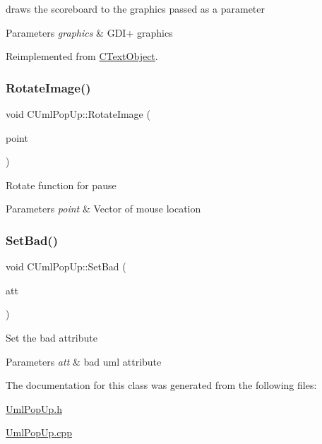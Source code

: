 draws the scoreboard to the graphics passed as a parameter 
\begin{DoxyParams}{Parameters}
{\em graphics} & G\+D\+I+ graphics \\
\hline
\end{DoxyParams}


Reimplemented from \mbox{\hyperlink{class_c_text_object_a467038e52d2e587083526cc42a76131f}{C\+Text\+Object}}.

\mbox{\label{class_c_uml_pop_up_a71d5c02b32a372120c438a2e607b1bae}} 
\subsubsection{\texorpdfstring{RotateImage()}{RotateImage()}}
{\footnotesize\ttfamily void C\+Uml\+Pop\+Up\+::\+Rotate\+Image (\begin{DoxyParamCaption}\item[{C\+Point}]{point }\end{DoxyParamCaption})\hspace{0.3cm}{\ttfamily [inline]}}

Rotate function for pause 
\begin{DoxyParams}{Parameters}
{\em point} & Vector of mouse location \\
\hline
\end{DoxyParams}
\mbox{\label{class_c_uml_pop_up_a787be205186fbccdb9c2e8c1921ab071}} 
\subsubsection{\texorpdfstring{SetBad()}{SetBad()}}
{\footnotesize\ttfamily void C\+Uml\+Pop\+Up\+::\+Set\+Bad (\begin{DoxyParamCaption}\item[{std\+::wstring}]{att }\end{DoxyParamCaption})\hspace{0.3cm}{\ttfamily [inline]}}

Set the bad attribute 
\begin{DoxyParams}{Parameters}
{\em att} & bad uml attribute \\
\hline
\end{DoxyParams}


The documentation for this class was generated from the following files\+:\begin{DoxyCompactItemize}
\item 
\mbox{\hyperlink{_uml_pop_up_8h}{Uml\+Pop\+Up.\+h}}\item 
\mbox{\hyperlink{_uml_pop_up_8cpp}{Uml\+Pop\+Up.\+cpp}}\end{DoxyCompactItemize}
